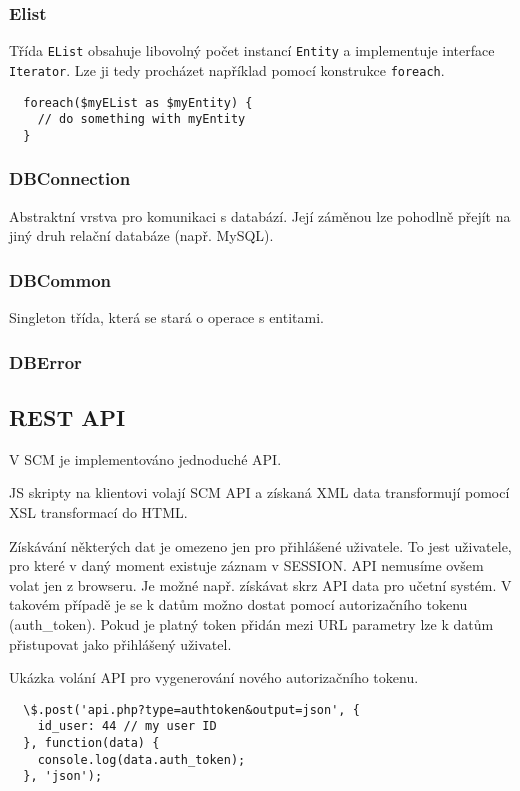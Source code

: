 \documentclass[12pt]{article}
\begin{document}
\subsubsection{Elist}
Třída \verb|EList| obsahuje libovolný počet instancí \verb|Entity| a implementuje interface \verb|Iterator|. Lze ji tedy procházet například pomocí konstrukce \verb|foreach|.

\begin{lstlisting}
  foreach($myEList as $myEntity) {
    // do something with myEntity
  }
\end{lstlisting}

\subsubsection{DBConnection}
Abstraktní vrstva pro komunikaci s databází. Její záměnou lze pohodlně přejít na jiný druh relační databáze (např. MySQL).

\subsubsection{DBCommon}
Singleton třída, která se stará o operace s entitami.

\subsubsection{DBError}


\subsection{REST API}

V SCM je implementováno jednoduché API. 

JS skripty na klientovi volají SCM API a získaná XML data transformují pomocí XSL transformací do HTML.

Získávání některých dat je omezeno jen pro přihlášené uživatele. To jest uživatele, pro které v daný moment existuje záznam v SESSION.
API nemusíme ovšem volat jen z browseru. Je možné např. získávat skrz API data pro učetní systém.
V takovém případě je se k datům možno dostat pomocí autorizačního tokenu (auth\_token). Pokud je platný token přidán mezi URL parametry lze k datům přistupovat jako přihlášený uživatel.

Ukázka volání API pro vygenerování nového autorizačního tokenu.
\begin{lstlisting}
  \$.post('api.php?type=authtoken&output=json', {
    id_user: 44 // my user ID
  }, function(data) {
    console.log(data.auth_token);
  }, 'json');
\end{lstlisting}
\end{document}
